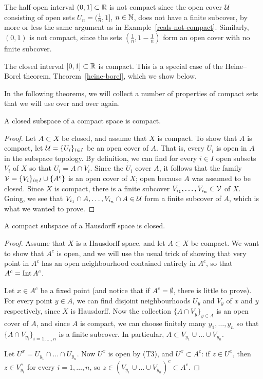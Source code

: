 \begin{example}
  The half-open interval $(0,1] \subset \mathbb{R}$ is not compact since the open cover $\mathcal{U}$ consisting of open sets $U_n = (\tfrac{1}{n},1]$, $n \in \mathbb{N}$, does not have a finite subcover, by more or less the same argument as in Example~\ref{reals-not-compact}. Similarly, $(0,1)$ is not compact, since the sets $(\tfrac{1}{n},1-\tfrac{1}{n})$ form an open cover with no finite subcover.
\end{example}
\begin{example}
  \label{interval-compact}
  The closed interval $[0,1] \subset \mathbb{R}$ is compact. This is a special case of the Heine--Borel theorem, Theorem~\ref{heine-borel}, which we show below.
\end{example}
In the following theorems, we will collect a number of properties of compact sets that we will use over and over again.
\begin{thm}
  \label{closed-in-compact}
  A closed subspace of a compact space is compact.
\end{thm}
\begin{proof}
  Let $A \subset X$ be closed, and assume that $X$ is compact. To show that $A$ is compact, let $\mathcal{U} = \{U_i\}_{i \in I}$ be an open cover of $A$. That is, every $U_i$ is open in $A$ in the subspace topology. By definition, we can find for every $i \in I$ open subsets $V_i$ of $X$ so that $U_i = A \cap V_i$. Since the $U_i$ cover $A$, it follows that the family $\mathcal{V} = \{V_i\}_{i \in I} \cup \{A^c\}$ is an open cover of $X$; open because $A$ was assumed to be closed. Since $X$ is compact, there is a finite subcover $V_{i_1}, \dots, V_{i_n} \in \mathcal{V}$ of $X$. Going, we see that $V_{i_1} \cap A, \dots, V_{i_n} \cap A \in \mathcal{U}$ form a finite subcover of $A$, which is what we wanted to prove.
\end{proof}
\begin{thm}
  \label{compact-in-Hausdorff}
  A compact subspace of a Hausdorff space is closed.
\end{thm}
\begin{proof}
  Assume that $X$ is a Hausdorff space, and let $A \subset X$ be compact. We want to show that $A^c$ is open, and we will use the usual trick of showing that very point in $A^c$ has an open neighbourhood contained entirely in $A^c$, so that $A^c = \operatorname{Int} A^c$.
  
  Let $x \in A^c$ be a fixed point (and notice that if $A^c = \emptyset$, there is little to prove). For every point $y \in A$, we can find disjoint neighbourhoods $U_y$ and $V_y$ of $x$ and $y$ respectively, since $X$ is Hausdorff. Now the collection $\{A \cap V_y\}_{y \in A}$ is an open cover of $A$, and since $A$ is compact, we can choose finitely many $y_1, \dots, y_n$ so that $\{A \cap V_{y_i}\}_{i=1,\dots,n}$ is a finite subcover. In particular, $A \subset V_{y_1} \cup \dots \cup V_{y_n}$.
  
  Let $U^x = U_{y_1} \cap \dots \cap U_{y_n}$. Now $U^x$ is open by (T3), and $U^x \subset A^c$: if $z \in U^x$, then $z \in V_{y_i}^c$ for every $i = 1, \dots, n$, so $z \in (V_{y_1} \cup \dots \cup V_{y_n})^c \subset A^c$.
\end{proof}
